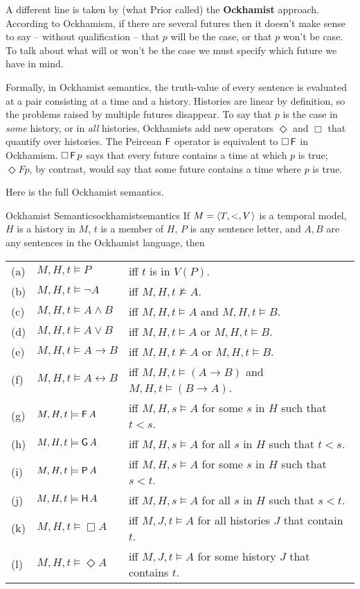 A different line is taken by (what Prior called) the \textbf{Ockhamist}
approach. According to Ockhamism, if there are several futures then it doesn't
make sense to say -- without qualification -- that $p$ will be the case, or that
$p$ won't be case. To talk about what will or won't be the case we must specify
which future we have in mind.

Formally, in Ockhamist semantics, the truth-value of every sentence is evaluated
at a pair consisting at a time and a history. Histories are linear by
definition, so the problems raised by multiple futures disappear. To say that
$p$ is the case in \emph{some} history, or in \emph{all} histories, Ockhamists
add new operators $\Diamond$ and $\Box$ that quantify over histories. The
Peircean $\operatorname{\mathsf{F}}$ operator is equivalent to $\Box \operatorname{\mathsf{F}}$ in Ockhamism. $\Box \operatorname{\mathsf{F}} p$
says that every future contains a time at which $p$ is true; $\Diamond Fp$, by
contrast, would say that some future contains a time where $p$ is true.

Here is the full Ockhamist semantics.

\begin{definition}{Ockhamist Semantics}{ockhamistsemantics}
  If $M = \t{T,<,V}$ is a temporal model, $H$ is a history in $M$, $t$
  is a member of $H$, $P$ is any sentence letter, and $A,B$ are any
  sentences in the Ockhamist language, then

  \medskip
  \begin{tabular}{lll}
    (a) & $M,H,t \models P$ &iff $t$ is in $V(P)$.\\
    (b) & $M,H,t \models \neg A$ &iff $M,H,t \not\models A$.\\
    (c) & $M,H,t \models A \land B$ &iff $M,H,t \models A$ and $M,H,t \models B$.\\
    (d) & $M,H,t \models A \lor B$ &iff $M,H,t \models A$ or $M,H,t \models B$.\\
    (e) & $M,H,t \models A \to B$ &iff $M,H,t \not\models A$ or $M,H,t \models B$.\\
    (f) & $M,H,t \models A \leftrightarrow B$ &iff $M,H,t \models (A\to B)$ and $M,H,t \models (B\to A)$.\\
    (g) & $M,H,t \models \tF A$ &iff $M,H,s \models A$ for some $s$ in $ H$ such that $t<s$.\\
    (h) & $M,H,t \models \tG A$ &iff $M,H,s \models A$ for all $s$ in $ H$ such that $t<s$.\\
    (i) & $M,H,t \models \tP A$ &iff $M,H,s \models A$ for some $s$ in $ H$ such that $s<t$.\\
    (j) & $M,H,t \models \tH A$ &iff $M,H,s \models A$ for all $s$ in $ H$ such that $s<t$.\\
    (k) & $M,H,t \models \Box A$ &iff $M,J,t \models A$ for all histories $J$ that contain $t$.\\
    (l) & $M,H,t \models \Diamond A$ &iff $M,J,t \models A$ for some history $J$ that contains $t$.
  \end{tabular}
\end{definition}

